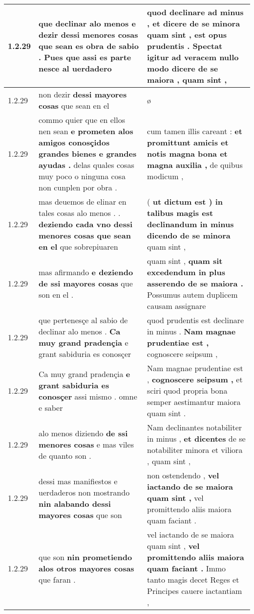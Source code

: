 \begin{tabular}{|p{1cm}|p{6.5cm}|p{6.5cm}|}
1.2.29 & que declinar alo menos \textbf{ e dezir dessi menores cosas que sean es obra de sabio . } Pues que assi es parte nesce al uerdadero & quod declinare ad minus , \textbf{ et dicere de se minora quam sint , est opus prudentis . Spectat igitur ad veracem nullo modo dicere de se maiora , } quam sint , \\\hline
1.2.29 & non dezir \textbf{ dessi mayores cosas } que sean en el & ø \\\hline
1.2.29 & commo quier que en ellos nen sean \textbf{ e prometen alos amigos conosçidos grandes bienes e grandes ayudas . } delas quales cosas muy poco o ninguna cosa non cunplen por obra . & cum tamen illis careant : \textbf{ et promittunt amicis et notis magna bona et magna auxilia , } de quibus modicum , \\\hline
1.2.29 & mas deuemos de elinar en tales cosas alo menos . . \textbf{ deziendo cada vno dessi menores cosas que sean en el } que sobrepiuaren & ( \textbf{ ut dictum est ) in talibus magis est declinandum in minus dicendo de se minora } quam sint , \\\hline
1.2.29 & mas afirmando \textbf{ e deziendo de ssi mayores cosas } que son en el . & quam sint , \textbf{ quam sit excedendum in plus asserendo de se maiora . } Possumus autem duplicem causam assignare \\\hline
1.2.29 & que pertenesçe al sabio de declinar alo menos . \textbf{ Ca muy grand pradençia } e grant sabiduria es conosçer & quod prudentis est declinare in minus . \textbf{ Nam magnae prudentiae est , } cognoscere seipsum , \\\hline
1.2.29 & Ca muy grand pradençia \textbf{ e grant sabiduria es conosçer } assi mismo . omne e saber & Nam magnae prudentiae est , \textbf{ cognoscere seipsum , } et sciri quod propria bona semper aestimantur maiora quam sint . \\\hline
1.2.29 & alo menos diziendo \textbf{ de ssi menores cosas } e mas viles de quanto son . & Nam declinantes notabiliter in minus , \textbf{ et dicentes } de se notabiliter minora et viliora , quam sint , \\\hline
1.2.29 & dessi mas manifiestos e uerdaderos non mostrando \textbf{ nin alabando dessi mayores cosas } que son & non ostendendo , \textbf{ vel iactando de se maiora quam sint , } vel promittendo aliis maiora quam faciant . \\\hline
1.2.29 & que son \textbf{ nin prometiendo alos otros mayores cosas } que faran . & vel iactando de se maiora quam sint , \textbf{ vel promittendo aliis maiora quam faciant . } Immo tanto magis decet Reges et Principes cauere iactantiam , \\\hline

\end{tabular}

